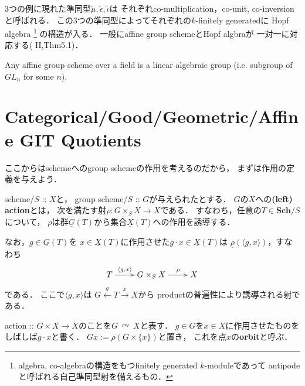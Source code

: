 \documentclass[a4paper]{jsarticle}
\newcommand{\Sch}{\mathbf{Sch}}
\newcommand{\func}[1]{\underline{#1}}
\newcommand{\acton}{\,\curvearrowright\,}
\begin{document}
    3つの例に現れた準同型$\tilde{\mu},\tilde{\epsilon},\tilde{\iota}$は
    それぞれco-multiplication，co-unit, co-inversionと呼ばれる．
    この3つの準同型によってそれぞれの$k$-finitely generatedに
    Hopf algebra
    \footnote
    {
        algebra, co-algebraの構造をもつfinitely generated $k$-moduleであって
        antipodeと呼ばれる自己準同型射を備えるもの．
    }
    の構造が入る．
    一般にaffine group schemeとHopf algbraが
    一対一に対応する(\cite{MilneAGS} II,Thm5.1)．

    \begin{Thm}
        Any affine group scheme over a field 
        is a linear algebraic group
        (i.e. subgroup of $GL_n$ for some $n$).
    \end{Thm}

\section{Categorical/Good/Geometric/Affine GIT Quotients}

    ここからはschemeへのgroup schemeの作用を考えるのだから，
    まずは作用の定義を与えよう．
    \begin{Def}
        scheme/$S$ :: $X$と，
        group scheme/$S$ :: $G$が与えられたとする．
        $G$の$X$への\textbf{(left) action}とは，
        次を満たす射$\rho: G \times_S X \to X$である．
        すなわち，任意の$T \in \Sch/S$について，
        $\rho$は群$\func{G}(T)$から集合$\func{X}(T)$への作用を誘導する．

        なお，$g \in \func{G}(T)$を
        $x \in \func{X}(T)$に作用させた$g \cdot x \in \func{X}(T)$は
        $\func{\rho}(\langle g,x \rangle)$，すなわち
        \[
        \xymatrix
        {
            T \ar[r]^-{\langle g,x \rangle}& G \times_S X \ar[r]^-{\rho}& X
        }
        \]
        である．
        ここで$\langle g, x \rangle$は
        $G \xleftarrow{g} T \xrightarrow{x} X$から
        productの普遍性により誘導される射である．

        action :: $G \times X \to X$のことを$G \acton X$と表す．
        $g \in G$を$x \in X$に作用させたものをしばしば$g \cdot x$と書く．
        $Gx:=\rho(G \times \{x\})$と置き，
        これを点$x$の\textbf{orbit}と呼ぶ．
    \end{Def}
\end{document}
